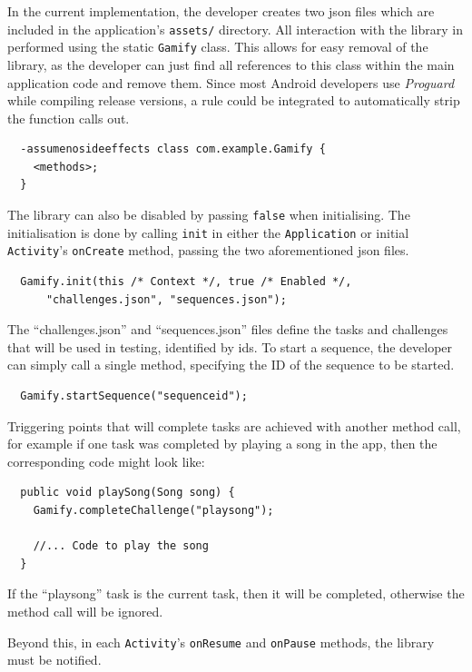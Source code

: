 In the current implementation, the developer creates two json files which are included in the application's \verb+assets/+ directory. All interaction with the library in performed using the static \verb/Gamify/ class. This allows for easy removal of the library, as the developer can just find all references to this class within the main application code and remove them. Since most Android developers use \emph{Proguard} while compiling release versions, a rule could be integrated to automatically strip the function calls out.

\begin{verbatim}
  -assumenosideeffects class com.example.Gamify {
    <methods>;
  } 
\end{verbatim}

The library can also be disabled by passing \verb|false| when initialising. The initialisation is done by calling \verb|init| in either the \verb|Application| or initial \verb|Activity|'s \verb|onCreate| method, passing the two aforementioned json files.

\begin{verbatim}
  Gamify.init(this /* Context */, true /* Enabled */,
      "challenges.json", "sequences.json");
\end{verbatim}

The ``challenges.json'' and ``sequences.json'' files define the tasks and challenges that will be used in testing, identified by ids. To start a sequence, the developer can simply call a single method, specifying the ID of the sequence to be started.

\begin{verbatim}
  Gamify.startSequence("sequenceid");
\end{verbatim}

Triggering points that will complete tasks are achieved with another method call, for example if one task was completed by playing a song in the app, then the corresponding code might look like:

\begin{verbatim}
  public void playSong(Song song) {
    Gamify.completeChallenge("playsong");
    
    //... Code to play the song
  }
\end{verbatim}

If the ``playsong'' task is the current task, then it will be completed, otherwise the method call will be ignored.

Beyond this, in each \verb|Activity|'s \verb|onResume| and \verb|onPause| methods, the library must be notified.

